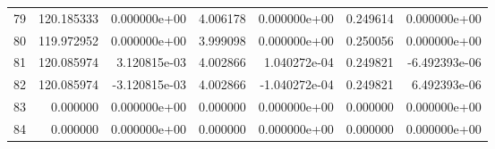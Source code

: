 \begin{tabular}{rrrrrrr}
79 & 120.185333 &  0.000000e+00 &  4.006178 &  0.000000e+00 &    0.249614 &  0.000000e+00 \\
80 & 119.972952 &  0.000000e+00 &  3.999098 &  0.000000e+00 &    0.250056 &  0.000000e+00 \\
81 & 120.085974 &  3.120815e-03 &  4.002866 &  1.040272e-04 &    0.249821 & -6.492393e-06 \\
82 & 120.085974 & -3.120815e-03 &  4.002866 & -1.040272e-04 &    0.249821 &  6.492393e-06 \\
83 &   0.000000 &  0.000000e+00 &  0.000000 &  0.000000e+00 &    0.000000 &  0.000000e+00 \\
84 &   0.000000 &  0.000000e+00 &  0.000000 &  0.000000e+00 &    0.000000 &  0.000000e+00 \\
\bottomrule
\end{tabular}
